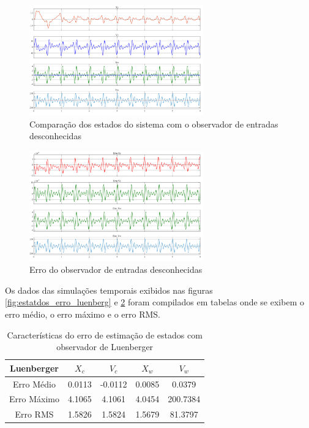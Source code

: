 \FloatBarrier
\begin{figure}[htbp]
    \begin{centering}
    \includegraphics[width=7.5cm]{img/estatdos_UIO.png} 
    \caption{Comparação dos estados do sistema com o observador de entradas desconhecidas}
    \label{fig:estatdos_UIO}
    \end{centering}
\end{figure}
\FloatBarrier

\FloatBarrier
\begin{figure}[htbp]
    \begin{centering}
    \includegraphics[width=7.5cm]{img/estatdos_Erro_UIO.png} 
    \caption{Erro do observador de entradas desconhecidas}
    \label{fig:estatdos_erro_UIO}
    \end{centering}
\end{figure}
\FloatBarrier

Os dados das simulações temporais exibidos nas figuras \ref{fig:estatdos_erro_luenberg} e \ref{fig:estatdos_erro_UIO} foram compilados em tabelas onde se exibem o erro médio, o erro máximo e o erro RMS.

\begin{table}[h!]
\footnotesize
\centering
    \begin{tabular}{|c|c|c|c|c|}
        \hline
        Luenberger & $X_c$& $V_c$& $X_w$& $V_w$\\
        \hline
        \hline
         Erro Médio&  0.0113& -0.0112& 0.0085&   0.0379\\ 
         Erro Máximo& 4.1065&  4.1061& 4.0454& 200.7384\\ 
         Erro RMS&    1.5826&  1.5824& 1.5679&  81.3797\\
        \hline
    \end{tabular} \label{tb:comparacao_erro_estado_LUE}\caption{Características do erro de estimação de estados com observador de Luenberger}
\end{table}

